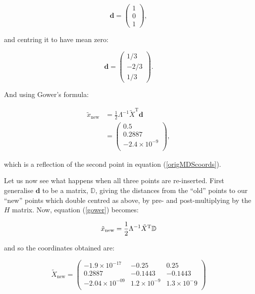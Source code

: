 \documentclass[a4paper,10pt]{amsart}
\newcommand{\tr}[1]{#1^{\text{T}}}
\newcommand{\cross}{\times}
\begin{document}
\begin{equation}
\mathbf{d}=\begin{pmatrix} 
	1\\
	0\\ 
	1
	\end{pmatrix},
\end{equation}

and centring it to have mean zero:

\begin{equation}
\mathbf{d}=\begin{pmatrix} 
	1/3\\
	-2/3\\ 
	1/3
	\end{pmatrix}.
\end{equation}

And using Gower's formula:

\begin{equation}
\begin{aligned}
\tilde{x}_{\text{new}} &= \frac{1}{2} \Lambda^{-1} \tr{\tilde{X}} \mathbf{d}\\
&=\begin{pmatrix}
0.5\\
0.2887\\
-2.4 \cross 10^{-9}\\
\end{pmatrix},
\end{aligned}
\end{equation}

which is a reflection of the second point in equation (\ref{origMDScoords}).

Let us now see what happens when all three points are re-inserted. First generalise $\mathbf{d}$ to be a matrix, $\mathbb{D}$, giving the distances from the ``old'' points to our ``new'' points which double centred as above, by pre- and post-multiplying by the $H$ matrix. Now, equation (\ref{gower}) becomes:

\begin{equation}
\tilde{x}_{\text{new}} = \frac{1}{2} \Lambda^{-1} \tr{\tilde{X}} \mathbb{D}\\
\end{equation}

and so the coordinates obtained are:

\begin{equation}
\tilde{X}_\text{new}=\begin{pmatrix}
-1.9\cross 10^{-17} & -0.25 & 0.25\\
 0.2887 & -0.1443 & -0.1443\\
-2.04\cross 10^{-09} &  1.2\cross 10^{-9} & 1.3\cross 10^-{9}\\
\end{pmatrix}
\end{equation}
\end{document}
